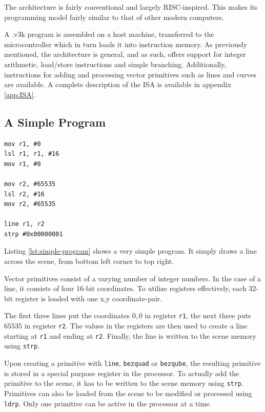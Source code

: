 The \vthreek architecture is fairly conventional and largely RISC-inspired.
This makes its programming model fairly similar to that of other modern computers.

A .v3k program is assembled on a host machine, transferred to the microcontroller which in turn loads it into instruction memory.
As previously mentioned, the \vthreek architecture is general, and as such, offers support for integer arithmetic, load/store instructions and simple branching.
Additionally, instructions for adding and processing vector primitives such as lines and curves are available.
A complete description of the \vthreek ISA is available in appendix \ref{app:ISA}.

\subsection{A Simple \vthreek Program}

\begin{lstlisting}[label=lst:simple-program]
mov r1, #0
lsl r1, r1, #16
mov r1, #0

mov r2, #65535
lsl r2, #16
mov r2, #65535

line r1, r2
strp #0x00000001
\end{lstlisting}

Listing \ref{lst:simple-program} shows a very simple \vthreek program.
It simply draws a line across the scene, from bottom left corner to top right.

Vector primitives consist of a varying number of integer numbers.
In the case of a line, it consists of four 16-bit coordinates.
To utilize registers effectively, each 32-bit register is loaded with one x,y coordinate-pair.

The first three lines put the coordinates $0,0$ in register \texttt{r1}, the next three puts $65535$ in register \texttt{r2}.
The values in the registers are then used to create a line starting at \texttt{r1} and ending at \texttt{r2}.
Finally, the line is written to the scene memory using \texttt{strp}.

Upon creating a primitive with \texttt{line}, \texttt{bezquad} or \texttt{bezqube}, the resulting primitive is stored in a special purpose register in the processor.
To actually add the primitive to the scene, it has to be written to the scene memory using \texttt{strp}.
Primitives can also be loaded from the scene to be modified or processed using \texttt{ldrp}.
Only one primitive can be active in the processor at a time.
